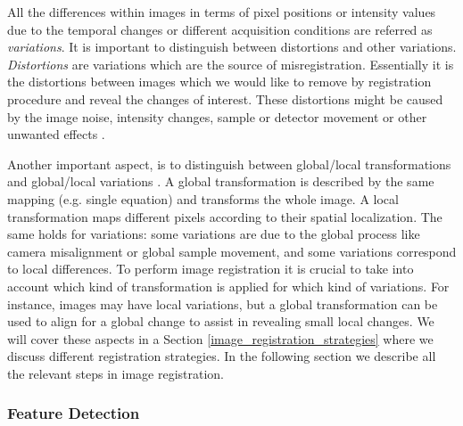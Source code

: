 All the differences within images in terms of pixel positions or intensity values due to the temporal changes or different acquisition conditions are referred as \textit{variations}.
It is important to distinguish between distortions and other variations. \textit{Distortions} are variations which are the source of misregistration.  Essentially it is the distortions between images which we would like to remove by registration procedure and reveal the changes of interest.
These distortions might be caused by the image noise, intensity changes, sample or detector movement or other unwanted effects \cite{Zitova03}.

Another important aspect, is to distinguish between global/local transformations and
global/local variations \cite{Brown92}.  A global transformation is described by the same mapping (e.g. single equation) and transforms the whole image. A local transformation maps different pixels according to their spatial localization.
The same holds for variations: some variations are due to the global process like camera misalignment or global sample movement, and some variations correspond to local differences.
To perform image registration it is crucial to take into account which kind of transformation is applied for which kind of variations. For instance, images may have local variations, but a global transformation can be used to align for a global change to assist in revealing small local changes.
We will cover these aspects in a Section \ref{image_registration_strategies} where we discuss different registration strategies. In the following section we describe all the relevant steps in image registration.



\subsubsection{Feature Detection}
\label{reg_feature_detection}

